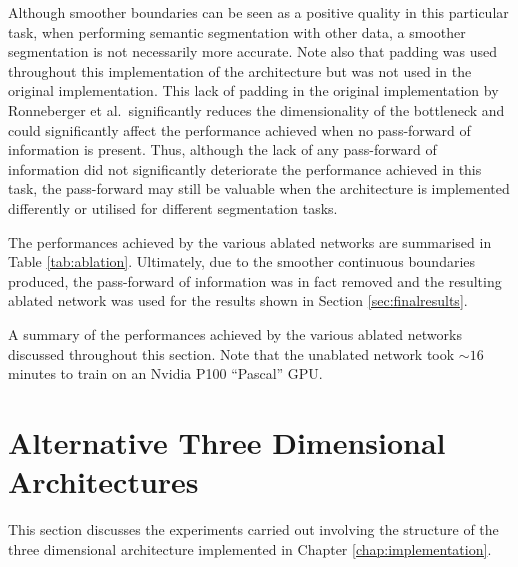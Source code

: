 Although smoother boundaries can be seen as a positive quality in this particular task, when performing semantic segmentation with other data, a smoother segmentation is not necessarily more accurate. Note also that padding was used throughout this implementation of the architecture but was not used in the original implementation. This lack of padding in the original implementation by Ronneberger et al.\ significantly reduces the dimensionality of the bottleneck and could significantly affect the performance achieved when no pass-forward of information is present. Thus, although the lack of any pass-forward of information did not significantly deteriorate the performance achieved in this task, the pass-forward may still be valuable when the architecture is implemented differently or utilised for different segmentation tasks.

The performances achieved by the various ablated networks are summarised in Table \ref{tab:ablation}. Ultimately, due to the smoother continuous boundaries produced, the pass-forward of information was in fact removed and the resulting ablated network was used for the results shown in Section \ref{sec:finalresults}.

\begin{table}[!t]
    \centering
    \caption{A summary of the performances achieved by the various ablated networks discussed throughout this section. Note that the unablated network took ${\sim}16$ minutes to train on an Nvidia P100 ``Pascal'' GPU.}
    
    \label{tab:ablation}
\end{table}

\section{Alternative Three Dimensional Architectures}

This section discusses the experiments carried out involving the structure of the three dimensional architecture implemented in Chapter \ref{chap:implementation}.



